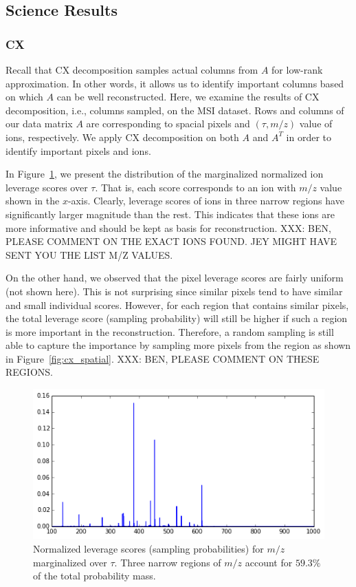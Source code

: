   \subsection{Science Results}
  \subsubsection{CX}
  Recall that CX decomposition samples actual columns from $A$ for low-rank approximation. In other words, it allows us to identify important columns based on which $A$ can be well reconstructed. Here, we examine the results of CX decomposition, i.e., columns sampled, on the MSI dataset.
 Rows and columns of our data matrix $A$ are corresponding to spacial pixels and $(\tau, m/z)$ value of ions, respectively. We apply CX decomposition on both $A$ and $A^T$ in order to identify important pixels and ions.
   
  In Figure~\ref{fig:cx_ions}, we present the distribution of the marginalized normalized ion leverage scores over $\tau$. That is, each score corresponds to an ion with $m/z$ value shown in the $x$-axis. Clearly, leverage scores of ions in three narrow regions have significantly larger magnitude than the rest. This indicates that these ions are more informative and should be kept as basis for reconstruction.  {\color{red} XXX: BEN, PLEASE COMMENT ON THE EXACT IONS FOUND. JEY MIGHT HAVE SENT YOU THE LIST M/Z VALUES. }
  
  On the other hand, we observed that the pixel leverage scores are fairly uniform (not shown here). This is not surprising since similar pixels tend to have similar and small individual scores. However, for each region that contains similar pixels, the total leverage score (sampling probability) will still be higher if such a region is more important in the reconstruction. Therefore, a random sampling is still able to capture the importance by sampling more pixels from the region as shown in Figure~\ref{fig:cx_spatial}.
  {\color{red} XXX: BEN, PLEASE COMMENT ON THESE REGIONS. }
    
    \begin{figure} [h!btp]
    \begin{centering}
    \includegraphics[width=\linewidth]{images/cx_ions.png}
    \end{centering}
    \caption{Normalized leverage scores (sampling probabilities) for $m/z$ marginalized over $\tau$.
      Three narrow regions of $m/z$ account for $59.3\%$ of the total probability mass.}
    \label{fig:cx_ions}
    \end{figure} 
    

